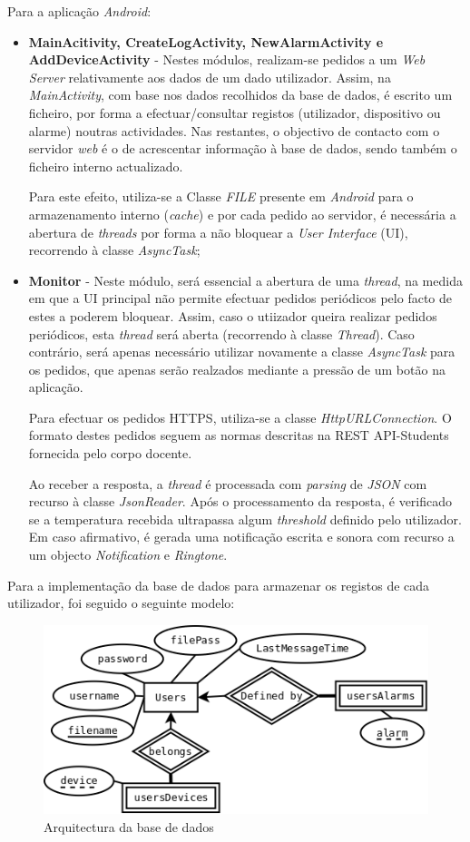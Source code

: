 \documentclass[a4paper]{article}
\begin{document}
Para a aplicação \textit{Android}:
\begin{itemize}
\item \textbf{MainAcitivity, CreateLogActivity, NewAlarmActivity e AddDeviceActivity} - Nestes módulos, realizam-se pedidos a um \textit{Web Server} relativamente aos dados de um dado utilizador. Assim, na \textit{MainActivity}, com base nos dados recolhidos da base de dados, é escrito um ficheiro, por forma a efectuar/consultar registos (utilizador, dispositivo ou alarme) noutras actividades. Nas restantes, o objectivo de contacto com o servidor \textit{web} é o de acrescentar informação à base de dados, sendo também o ficheiro interno actualizado. 

Para este efeito, utiliza-se a Classe \textit{FILE} presente em \textit{Android} para o armazenamento interno (\textit{cache}) e por cada pedido ao servidor, é necessária a abertura de \textit{threads} por forma a não bloquear a \textit{User Interface} (UI), recorrendo à classe \textit{AsyncTask};
\pagebreak
\item \textbf{Monitor} - Neste módulo, será essencial a abertura de uma \textit{thread}, na medida em que a UI principal não permite efectuar pedidos periódicos pelo facto de estes a poderem bloquear. Assim, caso o utiizador queira realizar pedidos periódicos, esta \textit{thread} será aberta (recorrendo à classe \textit{Thread}). Caso contrário, será apenas necessário utilizar novamente a classe \textit{AsyncTask} para os pedidos, que apenas serão realzados mediante a pressão de um botão na aplicação.

Para efectuar os pedidos HTTPS, utiliza-se a classe \textit{HttpURLConnection}. O formato destes pedidos seguem as normas descritas na REST API-Students fornecida pelo corpo docente.

Ao receber a resposta, a \textit{thread} é processada com \textit{parsing} de \textit{JSON} com recurso à classe \textit{JsonReader}. Após o processamento da resposta, é verificado se a temperatura recebida ultrapassa algum \textit{threshold} definido pelo utilizador. Em caso afirmativo, é gerada uma notificação escrita e sonora com recurso a um objecto \textit{Notification} e \textit{Ringtone}.
\end{itemize}

Para a implementação da base de dados para armazenar os registos de cada utilizador, foi seguido o seguinte modelo:

\begin{figure}[H]
  \centering
  \includegraphics[scale=0.40]{DB-ER.png}
  \caption{Arquitectura da base de dados}
  \label{fig:db-er}
\end{figure}
\end{document}
